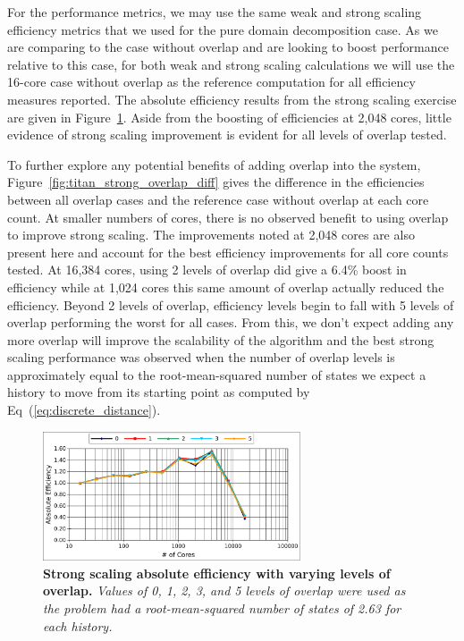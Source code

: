 \documentclass{snamc2013}
\begin{document}
For the performance metrics, we may use the same weak and strong
scaling efficiency metrics that we used for the pure domain
decomposition case. As we are comparing to the case without overlap
and are looking to boost performance relative to this case, for both
weak and strong scaling calculations we will use the 16-core case
without overlap as the reference computation for all efficiency
measures reported. The absolute efficiency results from the strong
scaling exercise are given in
Figure~\ref{fig:titan_strong_overlap}. Aside from the boosting of
efficiencies at 2,048 cores, little evidence of strong scaling
improvement is evident for all levels of overlap tested. 

To further explore any potential benefits of adding overlap into the
system, Figure~\ref{fig:titan_strong_overlap_diff} gives the
difference in the efficiencies between all overlap cases and the
reference case without overlap at each core count. At smaller numbers
of cores, there is no observed benefit to using overlap to improve
strong scaling. The improvements noted at 2,048 cores are also present
here and account for the best efficiency improvements for all core
counts tested. At 16,384 cores, using 2 levels of overlap did give a
6.4\% boost in efficiency while at 1,024 cores this same amount of
overlap actually reduced the efficiency. Beyond 2 levels of overlap,
efficiency levels begin to fall with 5 levels of overlap performing
the worst for all cases. From this, we don't expect adding any more
overlap will improve the scalability of the algorithm and the best
strong scaling performance was observed when the number of overlap
levels is approximately equal to the root-mean-squared number of
states we expect a history to move from its starting point as computed
by Eq~(\ref{eq:discrete_distance}).

\begin{figure}[h!]
  \begin{center}
    \includegraphics[width=3in]{titan_strong_overlap.pdf}
  \end{center}
  \caption{\textbf{Strong scaling absolute efficiency with varying
      levels of overlap.} \textit{Values of 0, 1, 2, 3, and 5 levels
      of overlap were used as the problem had a root-mean-squared
      number of states of 2.63 for each history.}}
  \label{fig:titan_strong_overlap}
\end{figure}
\end{document}
